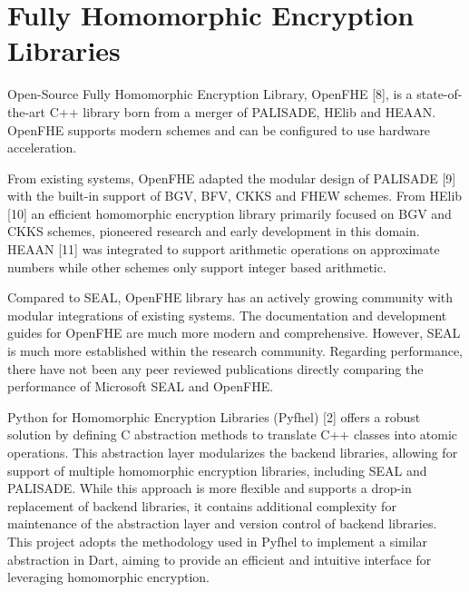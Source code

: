 \section{Fully Homomorphic Encryption Libraries}

Open-Source Fully Homomorphic Encryption Library, OpenFHE [8], is a state-of-the-art C++ library born from a merger of PALISADE, HElib and HEAAN. OpenFHE supports modern schemes and can be configured to use hardware acceleration.

From existing systems, OpenFHE adapted the modular design of PALISADE [9] with the built-in support of BGV, BFV, CKKS and FHEW schemes. From HElib [10] an efficient homomorphic encryption library primarily focused on BGV and CKKS schemes, pioneered research and early development in this domain. HEAAN [11] was integrated to support arithmetic operations on approximate numbers while other schemes only support integer based arithmetic.

Compared to SEAL, OpenFHE library has an actively growing community with modular integrations of existing systems. The documentation and development guides for OpenFHE are much more modern and comprehensive. However, SEAL is much more established within the research community. Regarding performance, there have not been any peer reviewed publications directly comparing the performance of Microsoft SEAL and OpenFHE.

Python for Homomorphic Encryption Libraries (Pyfhel) [2] offers a robust solution by defining C abstraction methods to translate C++ classes into atomic operations. This abstraction layer modularizes the backend libraries, allowing for support of multiple homomorphic encryption libraries, including SEAL and PALISADE. While this approach is more flexible and supports a drop-in replacement of backend libraries, it contains additional complexity for maintenance of the abstraction layer and version control of backend libraries. This project adopts the methodology used in Pyfhel to implement a similar abstraction in Dart, aiming to provide an efficient and intuitive interface for leveraging homomorphic encryption.
